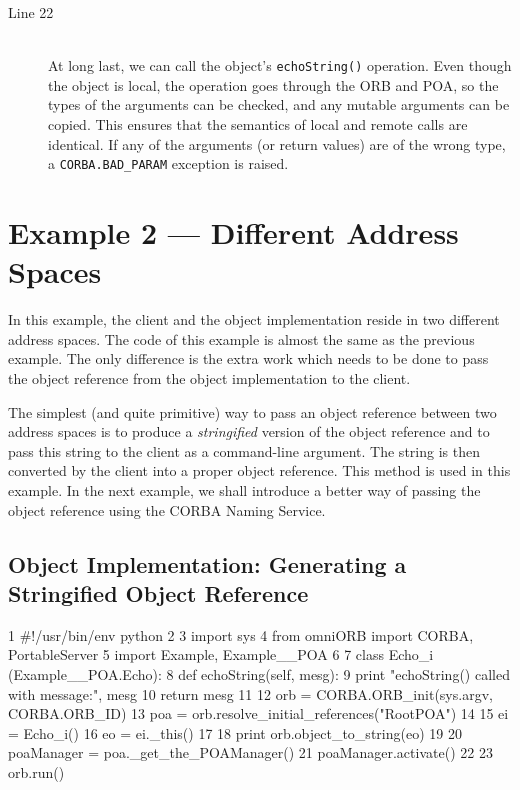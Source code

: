 \documentclass[11pt,twoside,a4paper]{book}
\newcommand{\code}[1]{\texttt{#1}}
\newcommand{\op}[1]{\texttt{#1()}}
\newcommand{\term}[1]{\textit{#1}}
\begin{document}
\begin{description}

\item[Line 22]\mbox{}\\
%
At long last, we can call the object's \op{echoString} operation.
Even though the object is local, the operation goes through the ORB
and POA, so the types of the arguments can be checked, and any mutable
arguments can be copied. This ensures that the semantics of local and
remote calls are identical. If any of the arguments (or return values)
are of the wrong type, a \code{CORBA.BAD\_PARAM} exception is raised.

\end{description}


\section{Example 2 --- Different Address Spaces}

In this example, the client and the object implementation reside in
two different address spaces. The code of this example is almost the
same as the previous example. The only difference is the extra work
which needs to be done to pass the object reference from the object
implementation to the client.

The simplest (and quite primitive) way to pass an object reference
between two address spaces is to produce a \term{stringified} version
of the object reference and to pass this string to the client as a
command-line argument.  The string is then converted by the client
into a proper object reference.  This method is used in this
example. In the next example, we shall introduce a better way of
passing the object reference using the CORBA Naming Service.


\subsection{Object Implementation: Generating a Stringified Object Reference}

\lstset{labelstep=1,gobble=4}
\begin{pylisting}
 1  #!/usr/bin/env python
 2  
 3  import sys
 4  from omniORB import CORBA, PortableServer
 5  import Example, Example__POA
 6  
 7  class Echo_i (Example__POA.Echo):
 8      def echoString(self, mesg):
 9          print "echoString() called with message:", mesg
10          return mesg
11  
12  orb = CORBA.ORB_init(sys.argv, CORBA.ORB_ID)
13  poa = orb.resolve_initial_references("RootPOA")
14  
15  ei = Echo_i()
16  eo = ei._this()
17  
18  print orb.object_to_string(eo)
19  
20  poaManager = poa._get_the_POAManager()
21  poaManager.activate()
22  
23  orb.run()
\end{pylisting}
\lstset{labelstep=0,gobble=0}
\end{document}
